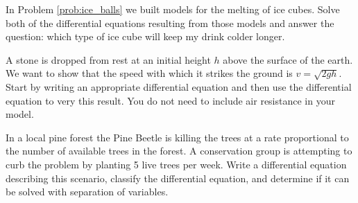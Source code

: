 \begin{problem}
    In Problem \ref{prob:ice_balls} we built models for the melting of ice cubes.  Solve
    both of the differential equations resulting from those models and answer the
    question: which type of ice cube will keep my drink colder longer.
\end{problem}
\begin{problem}
    A stone is dropped from rest at an initial height $h$ above the surface of the earth.
    We want to show that the speed with which it strikes the ground is $v = \sqrt{2gh}$.
    Start by writing an appropriate differential equation and then use the
    differential equation to very this result. You do not need to include air resistance
    in your model.
\end{problem}

\begin{problem}
    In a local pine forest the Pine Beetle is killing the trees at a rate proportional to the
    number of available trees in the forest.  A conservation group is attempting to curb the
    problem by planting 5 live trees per week.  Write a differential equation describing
    this scenario, classify the differential equation, and determine if it can be solved
    with separation of variables.
\end{problem}


